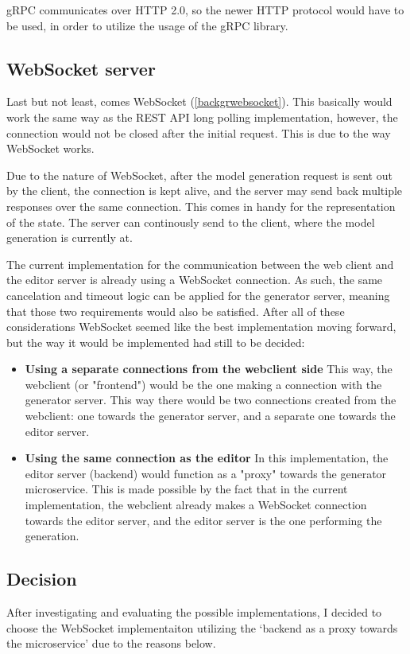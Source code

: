 	gRPC communicates over HTTP 2.0, so the newer HTTP protocol would have to be used, in order to utilize the usage of the gRPC library.

\subsection{WebSocket server}
	Last but not least, comes WebSocket (\ref{backgrwebsocket}). This basically would work the same way as the REST API long polling implementation,
	however, the connection would not be closed after the initial request. This is due to the way WebSocket works.
	
	Due to the nature of WebSocket, after the model generation request is sent out by the client,
	the connection is kept alive, and the server may send back multiple responses over the same connection.
	This comes in handy for the representation of the state. The server can continously send to the client,
	where the model generation is currently at.

	The current implementation for the communication between the web client and the editor server is already using a WebSocket connection.
	As such, the same cancelation and timeout logic can be applied for the generator server, meaning that those two requirements would also be satisfied.
	After all of these considerations WebSocket seemed like the best implementation moving forward, but the way it would be implemented
	had still to be decided:

	\begin{itemize}
			\item \textbf{Using a separate connections from the webclient side}
			This way, the webclient (or "frontend") would be the one making a connection with the generator server. This way
			there would be two connections created from the webclient: one towards the generator server, and a separate one 
			towards the editor server.

			\item \textbf{Using the same connection as the editor}
			In this implementation, the editor server (backend) would function as a "proxy" towards the generator microservice. This is made possible 
			by the fact that in the current implementation, the webclient already makes a WebSocket connection towards the editor server, and 
			the editor server is the one performing the generation.
	\end{itemize}

\subsection{Decision} \label{archdecision}
	After investigating and evaluating the possible implementations, I decided to choose the WebSocket implementaiton 
	utilizing the `backend as a proxy towards the microservice' due to the reasons below.


